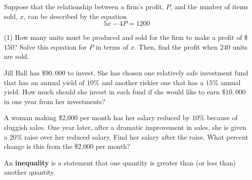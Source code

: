 \documentclass[../mathNotesPreamble]{subfiles}
\begin{document}
  \begin{ex*}
    Suppose that the relationship between a firm's profit, $P$, and the number of items sold, $x$, can be described by the equation
      \[5x-4P=1200\]
    \begin{tasks}[after-item-skip=\stretch{1}](1)
      \task How many units must be produced and sold for the firm to make a profit of \$$150$?
      \task Solve this equation for $P$ in terms of $x$. Then, find the profit when $240$ units are sold.
    \end{tasks}
  \end{ex*}
  \pagebreak

  \begin{ex*}
    Jill Ball has $\$90,000$ to invest. She has chosen one relatively safe investment fund that has an annual yield of $10\%$ and another riskier one that has a $15\%$ annual yield. How much should she invest in each fund if she would like to earn $\$10,000$ in one year from her investments?
  \end{ex*}

  \begin{ex*}
    A woman making \$2,000 per month has her salary reduced by 10\% because of sluggish sales. One year later, after a dramatic improvement in sales, she is given a 20\% raise over her reduced salary. Find her salary after the raise. What percent change is this from the \$2,000 per month?
  \end{ex*}
  \pagebreak

  \begin{defn*}
    An \textbf{inequality} is a statement that one quantity is greater than (or less than) another quantity.
  \end{defn*}

  
  \pagebreak
\end{document}

